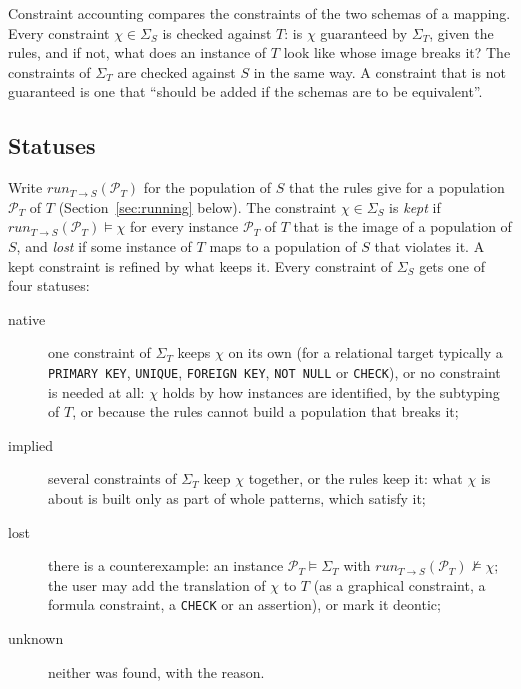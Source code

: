 \documentclass[11pt]{amsart}
\theoremstyle{definition}
\theoremstyle{remark}
\newcommand{\pop}{\mathcal{P}}
\begin{document}
Constraint accounting compares the constraints of the two schemas of a
mapping. Every constraint $\chi \in \Sigma_S$ is checked against $T$: is
$\chi$ guaranteed by $\Sigma_T$, given the rules, and if not, what does an
instance of $T$ look like whose image breaks it? The constraints of
$\Sigma_T$ are checked against $S$ in the same way. A constraint that is
not guaranteed is one that ``should be added if the schemas are to be
equivalent''.

\subsection{Statuses}

Write $\mathit{run}_{T \to S}(\pop_T)$ for the population of $S$ that the
rules give for a population $\pop_T$ of $T$
(Section~\ref{sec:running} below). The constraint $\chi \in \Sigma_S$ is
\emph{kept} if $\mathit{run}_{T \to S}(\pop_T) \models \chi$ for every
instance $\pop_T$ of $T$ that is the image of a population of $S$, and
\emph{lost} if some instance of $T$ maps to a population of $S$ that
violates it. A kept constraint is refined by what keeps it. Every
constraint of $\Sigma_S$ gets one of four statuses:
\begin{description}
  \item[native] one constraint of $\Sigma_T$ keeps $\chi$ on its own (for a
    relational target typically a \texttt{PRIMARY KEY}, \texttt{UNIQUE},
    \texttt{FOREIGN KEY}, \texttt{NOT NULL} or \texttt{CHECK}), or no
    constraint is needed at all: $\chi$ holds by how instances are
    identified, by the subtyping of $T$, or because the rules cannot build a
    population that breaks it;
  \item[implied] several constraints of $\Sigma_T$ keep $\chi$ together, or
    the rules keep it: what $\chi$ is about is built only as part of whole
    patterns, which satisfy it;
  \item[lost] there is a counterexample: an instance $\pop_T \models
    \Sigma_T$ with $\mathit{run}_{T \to S}(\pop_T) \not\models \chi$; the
    user may add the translation of $\chi$ to $T$ (as a graphical
    constraint, a formula constraint, a \texttt{CHECK} or an assertion), or
    mark it deontic;
  \item[unknown] neither was found, with the reason.
\end{description}
\end{document}
